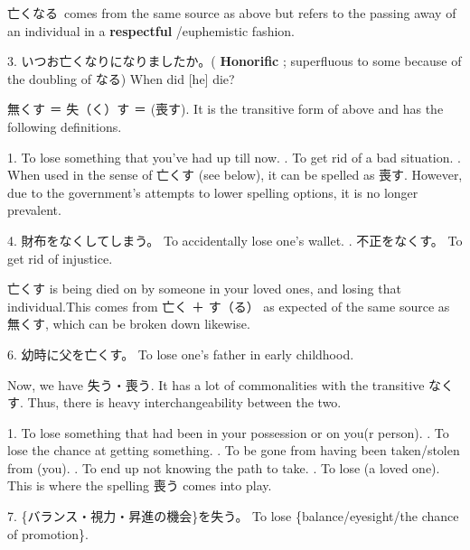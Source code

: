 \par{ 亡くなる comes from the same source as above but refers to the passing away of an individual in a \textbf{respectful }\slash euphemistic fashion. }
 
\par{3. いつお亡くなりになりましたか。( \textbf{Honorific }; superfluous to some because of the doubling of なる) \hfill\break
When did [he] die? }
 
\par{ 無くす ＝ 失（く）す ＝ (喪す). It is the transitive form of above and has the following definitions. }
 
\par{1. To lose something that you've had up till now. \hfill{}. To get rid of a bad situation. \hfill{}. When used in the sense of 亡くす (see below), it can be spelled as 喪す. However, due to the government's attempts to lower spelling options, it is no longer prevalent. }
 
\par{4. 財布をなくしてしまう。 \hfill\break
To accidentally lose one's wallet. \hfill\break
 \hfill{}. 不正をなくす。 \hfill\break
To get rid of injustice. }
 
\par{ 亡くす is being died on by someone in your loved ones, and losing that individual.This comes from 亡く ＋ す（る） as expected of the same source as 無くす, which can be broken down likewise. }
 
\par{6. 幼時に父を亡くす。 \hfill\break
To lose one's father in early childhood. }
 
\par{ Now, we have 失う・喪う. It has a lot of commonalities with the transitive なくす. Thus, there is heavy interchangeability between the two. }
 
\par{1. To lose something that had been in your possession or on you(r person). \hfill{}. To lose the chance at getting something. \hfill{}. To be gone from having been taken\slash stolen from (you). \hfill{}. To end up not knowing the path to take. \hfill{}. To lose (a loved one). This is where the spelling 喪う comes into play. }
 
\par{7. \{バランス・視力・昇進の機会\}を失う。 \hfill\break
To lose \{balance\slash eyesight\slash the chance of promotion\}. }
 
